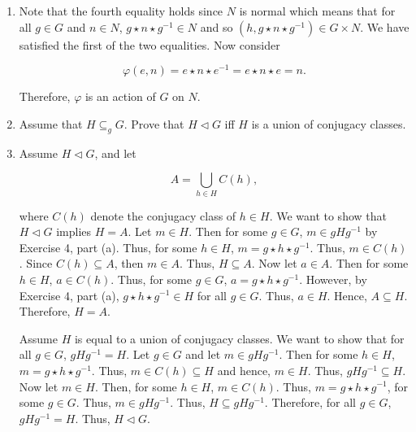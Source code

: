 \documentclass[12pt]{article}
\makeatletter
\theoremstyle{definition}
\theoremstyle{remark}
\renewenvironment{proof}[1][\proofname]{\par
  \pushQED{\qed}%
  \normalfont \topsep6\p@\@plus6\p@\relax
  \list{}{\leftmargin=0mm
          \rightmargin=0mm
          \settowidth{\itemindent}{\itshape#1}%
          \labelwidth=\itemindent
          \parsep=0pt \listparindent=\parindent 
  }
  \item[\hskip\labelsep
        \itshape
    #1\@addpunct{.}]\ignorespaces
}{%
  \popQED\endlist\@endpefalse
}
\let\oldproofname=\proofname
\renewcommand{\proofname}{\bf{\textit{\oldproofname}}}
\makeatother
\begin{document}
\begin{enumerate}[leftmargin=*]
\begin{enumerate}[label=(\alph*)]
\begin{proof}
                        Note that the fourth equality holds since $N$ is normal which means that for all $g\in G$ and $n\in N$, $g\star n\star g^{-1}\in N$ and so $(h,g\star n\star g^{-1})\in G\times N$. We have satisfied the first of the two equalities. Now consider
                        
                        \begin{equation*}
                            \varphi(e,n)=e\star n\star e^{-1}=e\star n\star e= n.
                        \end{equation*}
                        
                        Therefore, $\varphi$ is an action of $G$ on $N$.
                    \end{proof}
                    
                \item Assume that $H\subseteq_g G$. Prove that $H\triangleleft G$ iff $H$ is a union of conjugacy classes.
                    \begin{proof}
                        Assume $H\triangleleft G$, and let 
                        
                        \begin{equation*}
                            A=\bigcup_{h\in H}C(h),
                        \end{equation*}
                        
                        where $C(h)$ denote the conjugacy class of $h\in H$. We want to show that $H\triangleleft G$ implies $H=A$. Let $m\in H$. Then for some $g\in G$, $m\in gHg^{-1}$ by Exercise 4, part (a). Thus, for some $h\in H$, $m=g\star h\star g^{-1}$. Thus, $m\in C(h)$. Since $C(h)\subseteq A$, then $m\in A$. Thus, $H\subseteq A$. Now let $a\in A$. Then for some $h\in H$, $a\in C(h)$. Thus, for some $g\in G$, $a=g\star h\star g^{-1}$. However, by Exercise 4, part (a), $g\star h\star g^{-1}\in H$ for all $g\in G$. Thus, $a\in H$. Hence, $A\subseteq H$. Therefore, $H=A$.\par\hspace{4mm} Assume $H$ is equal to a union of conjugacy classes. We want to show that for all $g\in G$, $gHg^{-1}=H$. Let $g\in G$ and let $m\in gHg^{-1}$. Then for some $h\in H$, $m=g\star h\star g^{-1}$. Thus, $m\in C(h)\subseteq H$ and hence, $m\in H$. Thus, $gHg^{-1}\subseteq H$. Now let $m\in H$. Then, for some $h\in H$, $m\in C(h)$. Thus, $m=g\star h\star  g^{-1}$, for some $g\in G$. Thus, $m\in gHg^{-1}$. Thus, $H\subseteq gHg^{-1}$. Therefore, for all $g\in G$, $gHg^{-1}=H$. Thus, $H\triangleleft G$.  
                    \end{proof}
            \end{enumerate}
            

\end{enumerate}
\end{document}
